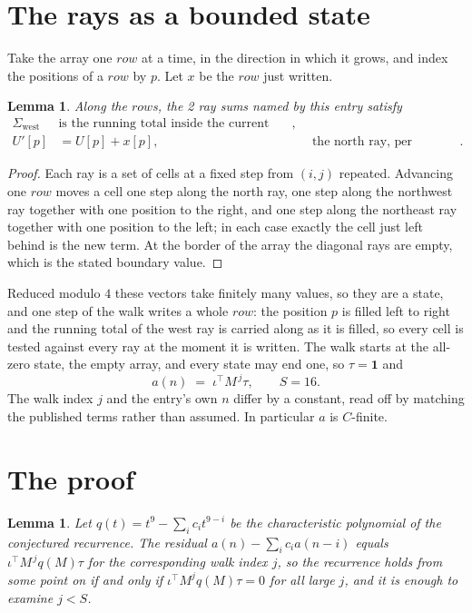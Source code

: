 \documentclass[11pt,a4paper]{article}
\theoremstyle{plain}
\newtheorem{lemma}[theorem]{Lemma}
\theoremstyle{definition}
\begin{document}
\section{The rays as a bounded state}

Take the array one $row$ at a time, in the direction in which it grows, and index the
positions of a $row $ by $p$. Let $x$ be the $row$ just written.

\begin{lemma}\label{lem:rays}
Along the $row$s, the 2 ray sums named by this entry satisfy
\[
\begin{aligned}
\Sigma_{\mathrm{west}}\ &\text{is the running total inside the current row},\\
U'[p]&=U[p]+x[p], &&\text{the north ray, per position} .
\end{aligned}
\]
\end{lemma}

\begin{proof}
Each ray is a set of cells at a fixed step from $(i,j)$ repeated. Advancing one $row$
moves a cell one step along the north ray, one step along the northwest ray together with one
position to the right, and one step along the northeast ray together with one position to the
left; in each case exactly the cell just left behind is the new term. At the border of the
array the diagonal rays are empty, which is the stated boundary value.
\end{proof}

Reduced modulo $4$ these vectors take finitely many values, so they are a state, and one step
of the walk writes a whole $row$: the position $p$ is filled left to right and the
running total of the west ray is carried along as it is filled, so every cell is tested
against every ray at the moment it is written. The walk starts at the all-zero state, the empty
array, and every state may end one, so $\tau=\mathbf{1}$ and
\[
a(n)\;=\;\iota^{\!\top}M^{\,j}\tau ,\qquad S=16.
\]
The walk index $j$ and the entry's own $n$ differ by a constant, read off by matching the
published terms rather than assumed. In particular $a$ is $C$-finite.

\section{The proof}

\begin{lemma}\label{lem:crit}
Let $q(t)=t^{9}-\sum_i c_it^{9-i}$ be the characteristic polynomial of the
conjectured recurrence. The residual $a(n)-\sum_ic_ia(n-i)$ equals
$\iota^{\!\top}M^{\,j}q(M)\tau$ for the corresponding walk index $j$, so the recurrence
holds from some point on if and only if $\iota^{\!\top}M^{j}q(M)\tau=0$ for all large $j$,
and it is enough to examine $j<S$.
\end{lemma}
\end{document}
